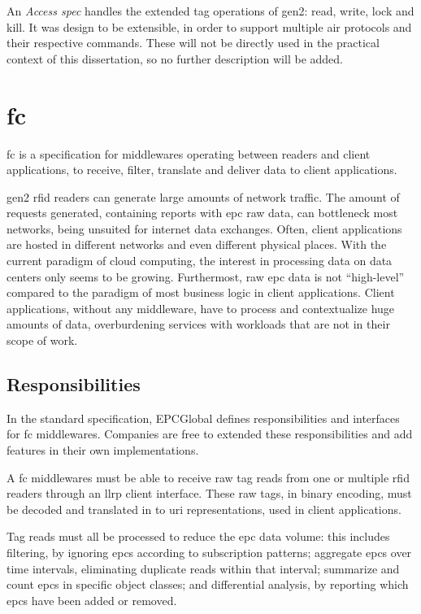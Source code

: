 An \emph{Access \ac{spec}} handles the extended tag operations of \ac{gen2}: read, write, lock and kill.
It was design to be extensible, in order to support multiple air protocols and their respective commands.
These will not be directly used in the practical context of this dissertation, so no further description will be added.

\section{\acf{fc}}

\ac{fc} is a specification for middlewares operating between readers and client applications, to receive, filter, translate and deliver data to client applications.

\ac{gen2} \ac{rfid} readers can generate large amounts of network traffic. The amount of requests generated, containing reports with \ac{epc} raw data, can bottleneck most networks, being unsuited for internet data exchanges. 
Often, client applications are hosted in different networks and even different physical places. With the current paradigm of cloud computing, the interest in processing data on data centers only seems to be growing.
Furthermost, raw \ac{epc} data is not ``high-level'' compared to the paradigm of most business logic in client applications.
Client applications, without any middleware, have to process and contextualize huge amounts of data, overburdening services with workloads that are not in their scope of work.

\subsection{Responsibilities}

In the standard specification, EPCGlobal defines responsibilities and interfaces for \ac{fc} middlewares. Companies are free to extended these responsibilities and add features in their own implementations.

A \ac{fc} middlewares must be able to receive raw tag reads from one or multiple \ac{rfid} readers through an \ac{llrp} client interface.
These raw tags, in binary encoding, must be decoded and translated in to \ac{uri} representations, used in client applications.

Tag reads must all be processed to reduce the \ac{epc} data volume: this includes filtering, by ignoring \acp{epc} according to subscription patterns; 
aggregate \acp{epc} over time intervals, eliminating duplicate reads within that interval;
summarize and count \acp{epc} in specific object classes;
and differential analysis, by reporting which \acp{epc} have been added or removed.

